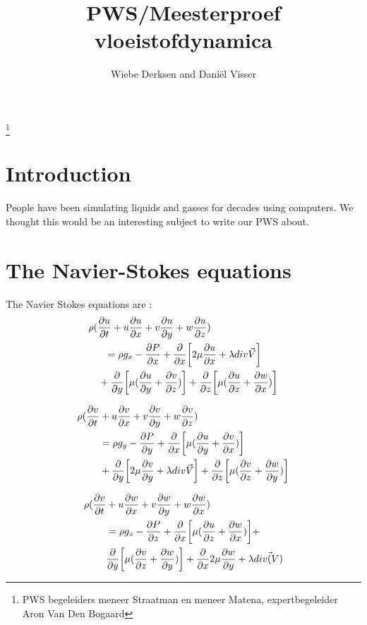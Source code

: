 \documentclass{article}
\title{PWS/Meesterproef vloeistofdynamica}
\author{Wiebe Derksen and Daniël Visser}
\begin{document}
\maketitle
\thispagestyle{empty}
\hfil
\thanks{PWS begeleiders meneer Straatman en meneer Matena, expertbegeleider Aron Van Den Bogaard}
\newpage
\tableofcontents
\newpage
\section{Introduction}
People have been simulating liquids and gasses for decades using computers. We thought this would be an interesting subject to write our PWS about.
\newpage

\section{The Navier-Stokes equations}
The Navier Stokes equations are \cite{Navier Stokes compressible}:
\begin{equation}
\begin{multlined}
\rho (\pdv{u}{t} + u \pdv{u}{x} + v \pdv{u}{y}+w\pdv{u}{z}) \\ = \rho g_{x}-\pdv{P}{x}+\pdv{x} \bqty{2\mu \pdv{u}{x} + \lambda div \vec{V}}\\ + \pdv{y} \bqty{\mu(\pdv{u}{y}+\pdv{v}{z})}+\pdv{z} \bqty{\mu (\pdv{u}{z}+\pdv{w}{x})}
\end{multlined}
\label{NSE-x}
\end{equation}

\begin{equation}
\begin{split}
\rho(\pdv{v}{t}&+u\pdv{v}{x}+v\pdv{v}{y}+w\pdv{v}{z}) \\&=\rho g_{y} -\pdv{P}{y} +\pdv{x} \bqty{\mu(\pdv{u}{y}+\pdv{v}{x})}\\&+ \pdv{y} \bqty{2\mu \pdv{v}{y} + \lambda div\vec{V}} +\pdv{z} \bqty{\mu(\pdv{v}{z}+\pdv{w}{y})}
\end{split}
\label{NSE-y}
\end{equation}

\begin{equation}
\begin{split}
\rho (\pdv{v}{t}& + u \pdv{w}{x} + v \pdv{w}{y} +  w \pdv{w}{x}) \\&= \rho g_{z} - \pdv{P}{z} + \pdv{x} \bqty{\mu(\pdv{u}{z}+\pdv{w}{x})}+\\ &\pdv{y}\bqty{\mu (\pdv{v}{z}+\pdv{w}{y})} +\pdv{x} 2\mu  \pdv{w}{y}+\lambda div \vec(V)
\label{NSE-z}
\end{split}
\end{equation}
\end{document}
